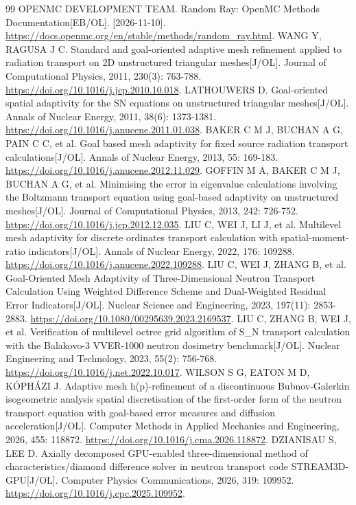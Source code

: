 \documentclass[UTF8, zihao=-4, fontset=none, a4paper]{ctexart}
\begin{document}
\begin{thebibliography}{99}
OPENMC DEVELOPMENT TEAM. Random Ray: OpenMC Methods Documentation[EB/OL]. [2026-11-10]. \url{https://docs.openmc.org/en/stable/methods/random_ray.html}.
WANG Y, RAGUSA J C. Standard and goal-oriented adaptive mesh refinement applied to radiation transport on 2D unstructured triangular meshes{[}J/OL{]}. Journal of Computational Physics, 2011, 230(3): 763-788. \url{https://doi.org/10.1016/j.jcp.2010.10.018}.
LATHOUWERS D. Goal-oriented spatial adaptivity for the SN equations on unstructured triangular meshes{[}J/OL{]}. Annals of Nuclear Energy, 2011, 38(6): 1373-1381. \url{https://doi.org/10.1016/j.anucene.2011.01.038}.
BAKER C M J, BUCHAN A G, PAIN C C, et al. Goal based mesh adaptivity for fixed source radiation transport calculations{[}J/OL{]}. Annals of Nuclear Energy, 2013, 55: 169-183. \url{https://doi.org/10.1016/j.anucene.2012.11.029}.
GOFFIN M A, BAKER C M J, BUCHAN A G, et al. Minimising the error in eigenvalue calculations involving the Boltzmann transport equation using goal-based adaptivity on unstructured meshes{[}J/OL{]}. Journal of Computational Physics, 2013, 242: 726-752. \url{https://doi.org/10.1016/j.jcp.2012.12.035}.
LIU C, WEI J, LI J, et al. Multilevel mesh adaptivity for discrete ordinates transport calculation with spatial-moment-ratio indicators{[}J/OL{]}. Annals of Nuclear Energy, 2022, 176: 109288. \url{https://doi.org/10.1016/j.anucene.2022.109288}.
LIU C, WEI J, ZHANG B, et al. Goal-Oriented Mesh Adaptivity of Three-Dimensional Neutron Transport Calculation Using Weighted Difference Scheme and Dual-Weighted Residual Error Indicators{[}J/OL{]}. Nuclear Science and Engineering, 2023, 197(11): 2853-2883. \url{https://doi.org/10.1080/00295639.2023.2169537}.
LIU C, ZHANG B, WEI J, et al. Verification of multilevel octree grid algorithm of S\_N transport calculation with the Balakovo-3 VVER-1000 neutron dosimetry benchmark{[}J/OL{]}. Nuclear Engineering and Technology, 2023, 55(2): 756-768. \url{https://doi.org/10.1016/j.net.2022.10.017}.
WILSON S G, EATON M D, KÓPHÁZI J. Adaptive mesh h(p)-refinement of a discontinuous Bubnov-Galerkin isogeometric analysis spatial discretisation of the first-order form of the neutron transport equation with goal-based error measures and diffusion acceleration{[}J/OL{]}. Computer Methods in Applied Mechanics and Engineering, 2026, 455: 118872. \url{https://doi.org/10.1016/j.cma.2026.118872}.
DZIANISAU S, LEE D. Axially decomposed GPU-enabled three-dimensional method of characteristics/diamond difference solver in neutron transport code STREAM3D-GPU{[}J/OL{]}. Computer Physics Communications, 2026, 319: 109952. \url{https://doi.org/10.1016/j.cpc.2025.109952}.

\end{thebibliography}
\end{document}
